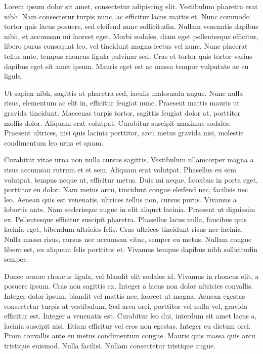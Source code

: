 \documentclass[a4paper]{memoir}
\begin{document}
Lorem ipsum dolor sit amet, consectetur adipiscing elit. Vestibulum pharetra erat nibh. Nam consectetur turpis nunc, ac efficitur lacus mattis et. Nunc commodo tortor quis lacus posuere, sed eleifend nunc sollicitudin. Nullam venenatis dapibus nibh, et accumsan mi laoreet eget. Morbi sodales, diam eget pellentesque efficitur, libero purus consequat leo, vel tincidunt magna lectus vel nunc. Nunc placerat tellus ante, tempus rhoncus ligula pulvinar sed. Cras et tortor quis tortor varius dapibus eget sit amet ipsum. Mauris eget est ac massa tempor vulputate ac eu ligula. 

Ut sapien nibh, sagittis at pharetra sed, iaculis malesuada augue. Nunc nulla risus, elementum ac elit in, efficitur feugiat nunc. Praesent mattis mauris ut gravida tincidunt. Maecenas turpis tortor, sagittis feugiat dolor at, porttitor mollis dolor. Aliquam erat volutpat. Curabitur suscipit maximus sodales. Praesent ultrices, nisi quis lacinia porttitor, arcu metus gravida nisi, molestie condimentum leo urna et quam. 

Curabitur vitae urna non nulla cursus sagittis. Vestibulum ullamcorper magna a risus accumsan rutrum et et sem. Aliquam erat volutpat. Phasellus eu sem volutpat, tempus neque ut, efficitur metus. Duis mi neque, faucibus in porta eget, porttitor eu dolor. Nam metus arcu, tincidunt congue eleifend nec, facilisis nec leo. Aenean quis est venenatis, ultrices tellus non, cursus purus. Vivamus a lobortis ante. Nam scelerisque augue in elit aliquet lacinia. Praesent ut dignissim ex. Pellentesque efficitur suscipit pharetra. Phasellus lacus nulla, faucibus quis lacinia eget, bibendum ultricies felis. Cras ultrices tincidunt risus nec lacinia. Nulla massa risus, cursus nec accumsan vitae, semper eu metus. Nullam congue libero est, eu aliquam felis porttitor et. Vivamus tempus dapibus nibh sollicitudin semper. 

Donec ornare rhoncus ligula, vel blandit elit sodales id. Vivamus in rhoncus elit, a posuere ipsum. Cras non sagittis ex. Integer a lacus non dolor ultricies convallis. Integer dolor ipsum, blandit vel mattis nec, laoreet ut magna. Aenean egestas consectetur turpis at vestibulum. Sed arcu orci, porttitor vel nulla vel, gravida efficitur est. Integer a venenatis est. Curabitur leo dui, interdum sit amet lacus a, lacinia suscipit nisi. Etiam efficitur vel eros non egestas. Integer eu dictum orci. Proin convallis ante eu metus condimentum congue. Mauris quis massa quis arcu tristique euismod. Nulla facilisi. Nullam consectetur tristique augue. 
\end{document}
